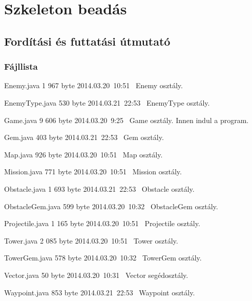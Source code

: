 %
\chapter{Szkeleton beadás}

\thispagestyle{fancy}

\section{Fordítási és futtatási útmutató}

\subsection{Fájllista}

\begin{fajllista}

\fajl
{Enemy.java} %
{1 967 byte} %
{2014.03.20~10:51~}
{Enemy osztály.} %

\fajl
{EnemyType.java} %
{530 byte} %
{2014.03.21~22:53~}
{EnemyType osztály.} %

\fajl
{Game.java} %
{9 606 byte} %
{2014.03.20~9:25~}
{Game osztály. Innen indul a program.} %

\fajl
{Gem.java} %
{403 byte} %
{2014.03.21~22:53~}
{Gem osztály.} %

\fajl
{Map.java} %
{926 byte} %
{2014.03.20~10:51~}
{Map osztály.} %

\fajl
{Mission.java} %
{771 byte} %
{2014.03.20~10:51~}
{Mission osztály.} %

\fajl
{Obstacle.java} %
{1 693 byte} %
{2014.03.21~22:53~}
{Obstacle osztály.} %

\fajl
{ObstacleGem.java} %
{599 byte} %
{2014.03.20~10:32~}
{ObstacleGem osztály.} %

\fajl
{Projectile.java} %
{1 165 byte} %
{2014.03.20~10:51~}
{Projectile osztály.} %

\fajl
{Tower.java} %
{2 085 byte} %
{2014.03.20~10:51~}
{Tower osztály.} %

\fajl
{TowerGem.java} %
{578 byte} %
{2014.03.20~10:32~}
{TowerGem osztály.} %

\fajl
{Vector.java} %
{50 byte} %
{2014.03.20~10:31~}
{Vector segédosztály.} %

\fajl
{Waypoint.java} %
{853 byte} %
{2014.03.21~22:53~}
{Waypoint osztály.} %

\end{fajllista}

